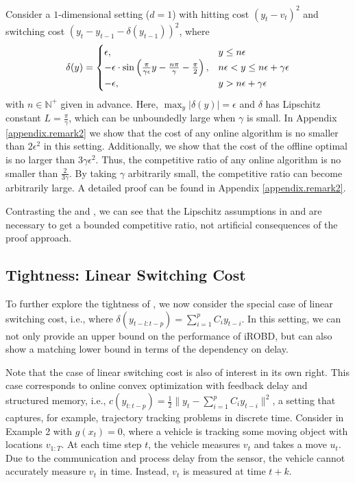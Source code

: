 \begin{remark}\label{remark.2} Consider a $1$-dimensional setting ($d = 1$) with hitting cost $(y_t-v_t)^2$ and switching cost $(y_t-y_{t-1}-\delta(y_{t-1}))^2$, where 
\begin{align}
\delta(y)=\begin{cases}
\epsilon, & y\le n\epsilon \\
-\epsilon\cdot\sin\left(\frac{\pi}{\gamma\epsilon}y-\frac{n\pi}{\gamma}-\frac{\pi}{2}\right), & n\epsilon<y\le n\epsilon+\gamma\epsilon\\
-\epsilon, & y>n\epsilon+\gamma\epsilon
\end{cases}\notag    
\end{align}
with $n\in\mathbb{N}^+$ given in advance. Here, $\max_y|\delta(y)|=\epsilon$ and $\delta$ has Lipschitz constant $L=\frac{\pi}{\gamma}$, which can be unboundedly large when $\gamma$ is small.  In Appendix \ref{appendix.remark2} we show that the cost of any online algorithm is no smaller than $2\epsilon^2$ in this setting. Additionally, we show that the cost of the offline optimal is no larger than $3\gamma\epsilon^2$. Thus, the competitive ratio of any online algorithm is no smaller than $\frac{2}{3\gamma}$. By taking $\gamma$ arbitrarily small, the competitive ratio can become arbitrarily large. A detailed proof can be found in Appendix \ref{appendix.remark2}.
\end{remark}

Contrasting the  and , we can see that the Lipschitz assumptions in  and  are necessary to get a bounded competitive ratio, not artificial consequences of the proof approach.

\subsection{Tightness: Linear Switching Cost}
To further explore the tightness of , we now consider the special case of linear switching cost, i.e., where $\delta(y_{t-l:t-p})=\sum_{i=1}^pC_iy_{t-i}$.  In this setting, we can not only provide an upper bound on the performance of iROBD, but can also show a matching lower bound in terms of the dependency on delay.  

Note that the case of linear switching cost is also of interest in its own right. This case corresponds to online convex optimization with feedback delay and structured memory, i.e., $c(y_{t:t-p})=\frac{1}{2}\|y_t-\sum_{i=1}^pC_iy_{t-i}\|^2$, a setting that captures, for example, trajectory tracking problems in discrete time. Consider  in Example 2 with $g(x_t)=0$, where a vehicle is tracking some moving object with locations $v_{1:T}$. At each time step $t$, the vehicle measures $v_t$ and takes a move $u_t$. Due to the communication and process delay from the sensor, the vehicle cannot accurately measure $v_t$ in time. Instead, $v_t$ is measured at time $t+k$. 

